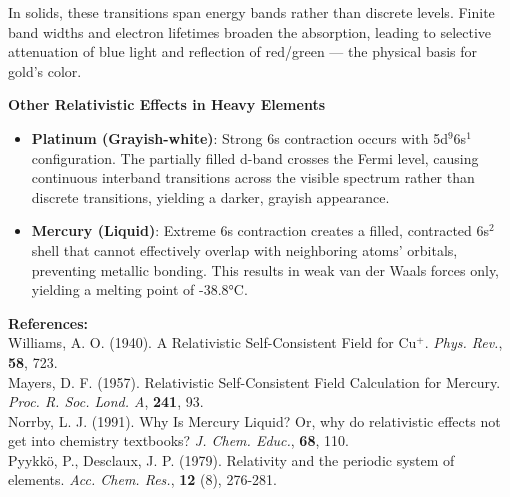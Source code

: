 \begin{technical}
    In solids, these transitions span energy bands rather than discrete levels. Finite band widths and electron lifetimes broaden the absorption, leading to selective attenuation of blue light and reflection of red/green — the physical basis for gold’s color.
    
    \noindent\textbf{Other Relativistic Effects in Heavy Elements}
    
    \begin{itemize}[leftmargin=*]
    \item \textbf{Platinum (Grayish-white)}: Strong 6s contraction occurs with 5d$^9$6s$^1$ configuration. The partially filled d-band crosses the Fermi level, causing continuous interband transitions across the visible spectrum rather than discrete transitions, yielding a darker, grayish appearance.
    
    \item \textbf{Mercury (Liquid)}: Extreme 6s contraction creates a filled, contracted 6s$^2$ shell that cannot effectively overlap with neighboring atoms' orbitals, preventing metallic bonding. This results in weak van der Waals forces only, yielding a melting point of -38.8°C.
    \end{itemize}
    

\vspace{0.5em}
\noindent\textbf{References:}\\
{\footnotesize
Williams, A. O. (1940). A Relativistic Self-Consistent Field for Cu\(^+\). \textit{Phys. Rev.}, \textbf{58}, 723.\\
Mayers, D. F. (1957). Relativistic Self-Consistent Field Calculation for Mercury. \textit{Proc. R. Soc. Lond. A}, \textbf{241}, 93.\\
Norrby, L. J. (1991). Why Is Mercury Liquid? Or, why do relativistic effects not get into chemistry textbooks? \textit{J. Chem. Educ.}, \textbf{68}, 110.\\
Pyykkö, P., Desclaux, J. P. (1979). Relativity and the periodic system of elements. \textit{Acc. Chem. Res.}, \textbf{12} (8), 276-281.
}
\end{technical}
